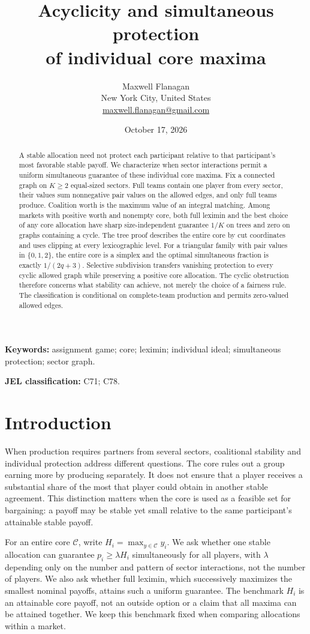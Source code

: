 \documentclass[11pt]{article}
\title{Acyclicity and simultaneous protection\\of individual core maxima}
\author{Maxwell Flanagan\\\small New York City, United States\\\small\href{mailto:maxwell.flanagan@gmail.com}{maxwell.flanagan@gmail.com}}
\date{October 17, 2026}
\theoremstyle{remark}\newtheorem{remark}[theorem]{Remark}
\newcommand{\core}{\mathcal C}
\begin{document}
\maketitle
\begin{abstract}
A stable allocation need not protect each participant relative to that
participant's most favorable stable payoff. We characterize when sector
interactions permit a uniform simultaneous guarantee of these individual core
maxima. Fix a connected graph on $K\ge2$ equal-sized sectors. Full teams contain
one player from every sector, their values sum nonnegative pair values on the
allowed edges, and only full teams produce. Coalition worth is the maximum
value of an integral matching. Among markets with positive worth and nonempty
core, both full leximin and the best choice of any core allocation have sharp
size-independent guarantee $1/K$ on trees and zero on graphs containing a
cycle. The tree proof describes the entire core by cut coordinates and uses
clipping at every lexicographic level. For a triangular family with pair values
in $\{0,1,2\}$, the entire core is a simplex and the optimal simultaneous
fraction is exactly $1/(2q+3)$. Selective subdivision transfers vanishing
protection to every cyclic allowed graph while preserving a positive core
allocation. The cyclic obstruction therefore concerns what stability can
achieve, not merely the choice of a fairness rule. The classification is
conditional on complete-team production and permits zero-valued allowed edges.
\end{abstract}
\noindent\textbf{Keywords:} assignment game; core; leximin; individual ideal;
simultaneous protection; sector graph.
\par\noindent\textbf{JEL classification:} C71; C78.

\section{Introduction}
When production requires partners from several sectors, coalitional stability
and individual protection address different questions. The core rules out a
group earning more by producing separately. It does not ensure that a player
receives a substantial share of the most that player could obtain in another
stable agreement. This distinction matters when the core is used as a feasible
set for bargaining: a payoff may be stable yet small relative to the same
participant's attainable stable payoff.

For an entire core $\core$, write $H_i=\max_{y\in\core}y_i$. We ask whether
one stable allocation can guarantee $p_i\ge\lambda H_i$ simultaneously for all
players, with $\lambda$ depending only on the number and pattern of sector
interactions, not the number of players. We also ask whether full leximin,
which successively maximizes the smallest nominal payoffs, attains such a
uniform guarantee. The benchmark $H_i$ is an attainable core payoff, not an
outside option or a claim that all maxima can be attained together. We keep
this benchmark fixed when comparing allocations within a market.
\end{document}
